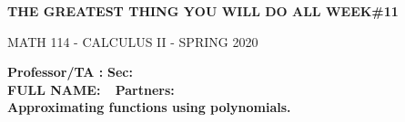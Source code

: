 \documentclass[10 pt]{article}
\begin{document}
{\Large\bf{THE GREATEST THING YOU WILL DO ALL WEEK\#11 }}
\begin{center}
	\Large{  MATH 114 - CALCULUS II -  SPRING 2020}
\end{center}
{ \bf Professor/TA :} \underline{\hspace{ 5cm}} \hspace{1 cm} {\bf Sec:} \underline{\hspace{ 4.7cm}}
\vspace{0.3 cm}\\
{\bf FULL NAME:} \ \underline{\hspace{ 4.9cm}} \hspace{ 1 cm}
{\bf Partners:} \underline{\hspace{ 4cm}}
\vspace{1 cm}\\


\noindent\makebox[\linewidth]{\rule{\textwidth}{0.01pt}}
\textbf{Approximating functions using polynomials.}\\
\noindent\makebox[\linewidth]{\rule{\textwidth}{0.01pt}}
\end{document}
